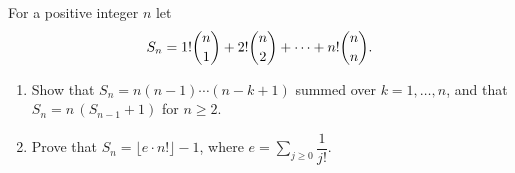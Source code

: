 For a positive integer $n$ let
\[
S_n=1!\dbinom{n}{1}+2!\dbinom{n}{2}+\dots+n!\dbinom{n}{n}.
\]
\begin{enumerate}
\item[(a)] Show that $S_n=n(n-1)\cdots(n-k+1)$ summed over $k=1,\dots,n$, and that $S_n=n\,(S_{n-1}+1)$ for $n\ge2$.
\item[(b)] Prove that $S_n=\lfloor e\cdot n!\rfloor-1$, where $e=\sum_{j\ge0}\dfrac{1}{j!}$.
\end{enumerate}

